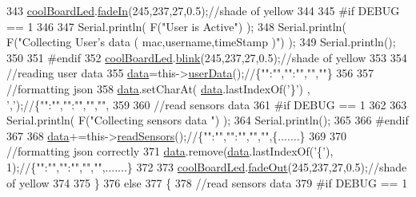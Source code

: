\begin{DoxyCode}
343         \hyperlink{classCoolBoard_a1b1d3c684a5baa56b08486e192fd8e97}{coolBoardLed}.\hyperlink{classCoolBoardLed_ab778f5e7bed0ab74e3906d82110493c3}{fadeIn}(245,237,27,0.5);\textcolor{comment}{//shade of yellow}
344     
345 \textcolor{preprocessor}{    #if DEBUG == 1}
346 
347         Serial.println( F(\textcolor{stringliteral}{"User is Active"}) );
348         Serial.println( F(\textcolor{stringliteral}{"Collecting User's data ( mac,username,timeStamp )"}) );
349         Serial.println();
350     
351 \textcolor{preprocessor}{    #endif  }
352         \hyperlink{classCoolBoard_a1b1d3c684a5baa56b08486e192fd8e97}{coolBoardLed}.\hyperlink{classCoolBoardLed_a96e1ea13003eee34c9dbcef340404426}{blink}(245,237,27,0.5);\textcolor{comment}{//shade of yellow   }
353 
354         \textcolor{comment}{//reading user data}
355         \hyperlink{classCoolBoard_a427fb753dd8575bdf821c70a5c63d695}{data}=this->\hyperlink{classCoolBoard_ae7358fb6e623cfc81b775f5f1734909b}{userData}();\textcolor{comment}{//\{"":"","":"","",""\}}
356 
357         \textcolor{comment}{//formatting json }
358         \hyperlink{classCoolBoard_a427fb753dd8575bdf821c70a5c63d695}{data}.setCharAt( \hyperlink{classCoolBoard_a427fb753dd8575bdf821c70a5c63d695}{data}.lastIndexOf(\textcolor{charliteral}{'\}'}) , \textcolor{charliteral}{','});\textcolor{comment}{//\{"":"","":"","","",}
359                 
360         \textcolor{comment}{//read sensors data}
361 \textcolor{preprocessor}{    #if DEBUG == 1}
362 
363         Serial.println( F(\textcolor{stringliteral}{"Collecting sensors data "}) );
364         Serial.println();
365     
366 \textcolor{preprocessor}{    #endif}
367 
368         \hyperlink{classCoolBoard_a427fb753dd8575bdf821c70a5c63d695}{data}+=this->\hyperlink{classCoolBoard_ad03abdce2e65f520bbf2cff0f2d083cf}{readSensors}();\textcolor{comment}{//\{"":"","":"","","",\{.......\}     }
369 
370         \textcolor{comment}{//formatting json correctly}
371         \hyperlink{classCoolBoard_a427fb753dd8575bdf821c70a5c63d695}{data}.remove(\hyperlink{classCoolBoard_a427fb753dd8575bdf821c70a5c63d695}{data}.lastIndexOf(\textcolor{charliteral}{'\{'}), 1);\textcolor{comment}{//\{"":"","":"","","",.......\}}
372         
373         \hyperlink{classCoolBoard_a1b1d3c684a5baa56b08486e192fd8e97}{coolBoardLed}.\hyperlink{classCoolBoardLed_a93d545679237e8cc858324367149775c}{fadeOut}(245,237,27,0.5);\textcolor{comment}{//shade of yellow}
374                 
375     \}   
376     \textcolor{keywordflow}{else}
377     \{
378         \textcolor{comment}{//read sensors data}
379 \textcolor{preprocessor}{    #if DEBUG == 1}

\end{DoxyCode}
